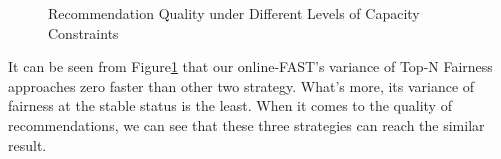 \begin{figure}[h]
\centering
% 
%
\quad
{}%
\quad
{}%
\quad
{}%
\centering
\caption{Recommendation Quality under Different Levels of Capacity Constraints}
\label{fig:Yelp}
\end{figure}

It can be seen from Figure\ref{fig:Yelp} that our online-FAST's variance of Top-N Fairness approaches zero faster than other two strategy. What's more, its variance of fairness at the stable status is the least. When it comes to the quality of recommendations, we can see that these three strategies can reach the similar result.



